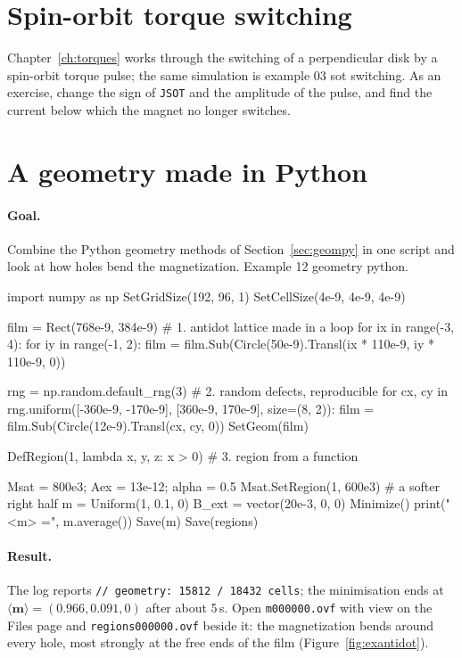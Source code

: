 \documentclass[11pt,a4paper,oneside]{book}
\newcommand{\code}[1]{\texttt{#1}}
\renewcommand{\_}{\textunderscore\allowbreak}
\newcommand{\menu}[1]{\textsf{#1}}
\begin{document}
\section{Spin-orbit torque switching}

Chapter~\ref{ch:torques} works through the switching of a perpendicular disk by a spin-orbit torque pulse;
the same simulation is example \menu{03 sot switching}. As an exercise, change the sign of \code{JSOT} and the
amplitude of the pulse, and find the current below which the magnet no longer switches.

\section{A geometry made in Python}

\paragraph{Goal.} Combine the Python geometry methods of Section~\ref{sec:geompy} in one script and look at how
holes bend the magnetization. Example \menu{12 geometry python}.

\begin{pycode}
import numpy as np
SetGridSize(192, 96, 1)
SetCellSize(4e-9, 4e-9, 4e-9)

film = Rect(768e-9, 384e-9)                      # 1. antidot lattice made in a loop
for ix in range(-3, 4):
    for iy in range(-1, 2):
        film = film.Sub(Circle(50e-9).Transl(ix * 110e-9, iy * 110e-9, 0))

rng = np.random.default_rng(3)                   # 2. random defects, reproducible
for cx, cy in rng.uniform([-360e-9, -170e-9], [360e-9, 170e-9], size=(8, 2)):
    film = film.Sub(Circle(12e-9).Transl(cx, cy, 0))
SetGeom(film)

DefRegion(1, lambda x, y, z: x > 0)              # 3. region from a function

Msat = 800e3; Aex = 13e-12; alpha = 0.5
Msat.SetRegion(1, 600e3)                         # a softer right half
m = Uniform(1, 0.1, 0)
B_ext = vector(20e-3, 0, 0)
Minimize()
print("<m> =", m.average())
Save(m)
Save(regions)
\end{pycode}

\paragraph{Result.} The log reports \code{// geometry: 15812 / 18432 cells}; the minimisation ends at
$\langle\mathbf m\rangle = (0.966, 0.091, 0)$ after about 5\,s. Open \code{m000000.ovf} with \menu{view} on the
Files page and \code{regions000000.ovf} beside it: the magnetization bends around every hole, most strongly at
the free ends of the film (Figure~\ref{fig:exantidot}).
\end{document}
